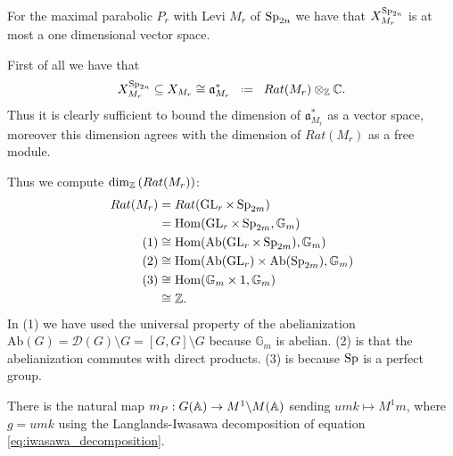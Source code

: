 \begin{example}\label{ex:characters}
    For the maximal parabolic \(P_r\) with Levi \(M_r\) of \(\operatorname{Sp}_{2n}\) we have that \( X_{M_r}^{\operatorname{Sp}_{2n}}\) is at most a one dimensional \C vector space. 

    First of all we have that \cite[I.1.4]{moeglinSpectralDecompositionEisenstein1995}
         \[ X_{M_r}^{\Sp_{2n}} \subseteq X_{M_r} \cong \mathfrak{a}_{M_r}^*\defeq Rat(M_r) \tensor_\Z \C.\]
        Thus it is clearly sufficient to bound the dimension of \(\mathfrak{a}_{M_r}^*\) as a \C vector space, moreover this dimension agrees with the dimension of \(Rat(M_r)\) as a free \Z module. 

        Thus we compute \(\dim_\Z(Rat(M_r))\):
        \begin{equation*}
            \begin{aligned}
                Rat(M_r) &= Rat(\GL_r \times \Sp_{2m}) \\
                         &= \Hom(\GL_r \times \Sp_{2m}, \mathbb{G}_m) \\
                         (1)&\cong \Hom(\mathrm{Ab}(\GL_r \times \Sp_{2m}), \mathbb{G}_m) \\
                         (2)&\cong \Hom(\mathrm{Ab}(\GL_r) \times \mathrm{Ab}(\Sp_{2m}), \mathbb{G}_m) \\
                         (3)&\cong \Hom(\mathbb{G}_m \times 1, \mathbb{G}_m) \\
                         &\cong \Z.
            \end{aligned}
        \end{equation*}
        In (1) we have used the universal property of the abelianization \(\mathrm{Ab}(G) = \mathcal{D}(G) \setminus G = [G, G] \setminus G \) because \(\mathbb{G}_m\) is abelian. (2) is that the abelianization commutes with direct products. (3) is because \(\operatorname{Sp}\) is a perfect group.
\end{example}


There is the natural map \(m_P: G(\A) \to M^1 \backslash M(\A)\) sending \(umk \mapsto M^1 m\), where \(g = umk\) using the Langlands-Iwasawa decomposition of equation \ref{eq:iwasawa_decomposition}.

